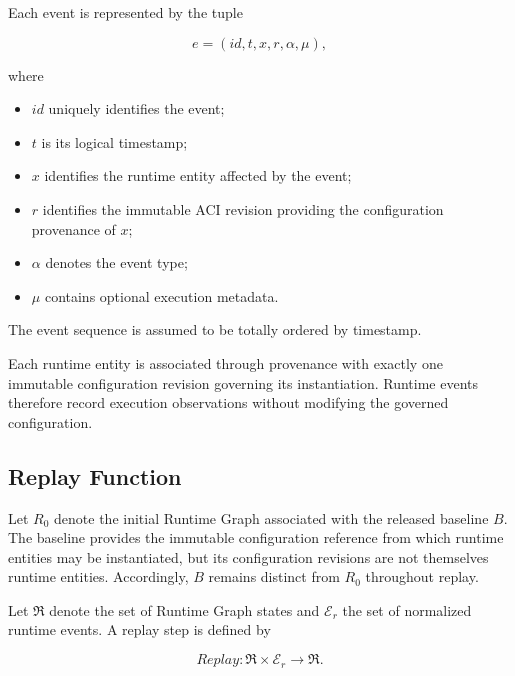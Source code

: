 \documentclass[10pt]{article}
\begin{document}
Each event is represented by the tuple

\begin{equation}
	e
	=
	(
	id,
	t,
	x,
	r,
	\alpha,
	\mu
	),
	\label{eq:runtime_event}
\end{equation}

where

\begin{itemize}
	\item $id$ uniquely identifies the event;
	\item $t$ is its logical timestamp;
	\item $x$ identifies the runtime entity affected by the event;
	\item $r$ identifies the immutable ACI revision providing the configuration
	provenance of $x$;
	\item $\alpha$ denotes the event type;
	\item $\mu$ contains optional execution metadata.
\end{itemize}

The event sequence is assumed to be totally ordered by timestamp.

Each runtime entity is associated through provenance with exactly one immutable
configuration revision governing its instantiation. Runtime events therefore
record execution observations without modifying the governed configuration.

\subsection{Replay Function}
\label{appendix:replay_function}

Let $R_0$ denote the initial Runtime Graph associated with the released
baseline $B$. The baseline provides the immutable configuration reference from
which runtime entities may be instantiated, but its configuration revisions are
not themselves runtime entities. Accordingly, $B$ remains distinct from
$R_0$ throughout replay.

Let $\mathfrak R$ denote the set of Runtime Graph states and
$\mathcal E_r$ the set of normalized runtime events. A replay step is defined by

\begin{equation}
	Replay
	:
	\mathfrak R
	\times
	\mathcal E_r
	\rightarrow
	\mathfrak R.
	\label{eq:runtime_replay}
\end{equation}
\end{document}
